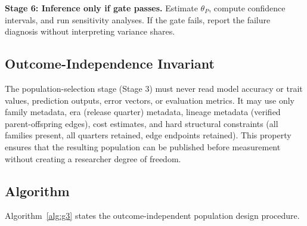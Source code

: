 \documentclass{ieeeaccess}
\theoremstyle{definition}
\theoremstyle{plain}
\begin{document}
\textbf{Stage 6: Inference only if gate passes.} Estimate $\theta_P$, compute confidence intervals, and run sensitivity analyses. If the gate fails, report the failure diagnosis without interpreting variance shares.

\subsection{Outcome-Independence Invariant}
The population-selection stage (Stage 3) must never read model accuracy or trait values, prediction outputs, error vectors, or evaluation metrics. It may use only family metadata, era (release quarter) metadata, lineage metadata (verified parent-offspring edges), cost estimates, and hard structural constraints (all families present, all quarters retained, edge endpoints retained). This property ensures that the resulting population can be published before measurement without creating a researcher degree of freedom.

\subsection{Algorithm}
Algorithm~\ref{alg:g3} states the outcome-independent population design procedure.
\end{document}
